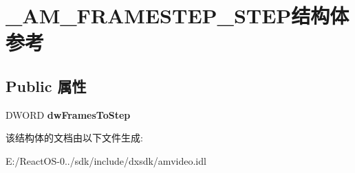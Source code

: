 \hypertarget{struct___a_m___f_r_a_m_e_s_t_e_p___s_t_e_p}{}\section{\+\_\+\+A\+M\+\_\+\+F\+R\+A\+M\+E\+S\+T\+E\+P\+\_\+\+S\+T\+E\+P结构体 参考}
\label{struct___a_m___f_r_a_m_e_s_t_e_p___s_t_e_p}
\subsection*{Public 属性}
\begin{DoxyCompactItemize}
\item 
\mbox{\label{struct___a_m___f_r_a_m_e_s_t_e_p___s_t_e_p_af2b0c088b5ab7391d17b160468784e01}} 
D\+W\+O\+RD {\bfseries dw\+Frames\+To\+Step}
\end{DoxyCompactItemize}


该结构体的文档由以下文件生成\+:\begin{DoxyCompactItemize}
\item 
E\+:/\+React\+O\+S-\/0../sdk/include/dxsdk/amvideo.\+idl\end{DoxyCompactItemize}
